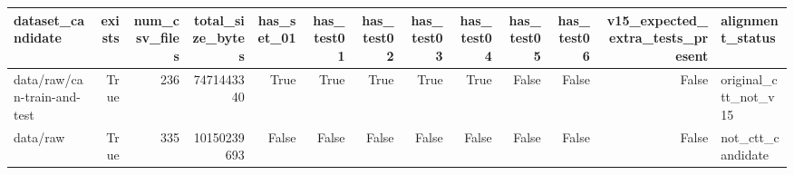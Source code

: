 \begin{tabular}{lrrrrrrrrrrrl}
\toprule
dataset\_candidate & exists & num\_csv\_files & total\_size\_bytes & has\_set\_01 & has\_test01 & has\_test02 & has\_test03 & has\_test04 & has\_test05 & has\_test06 & v15\_expected\_extra\_tests\_present & alignment\_status \\
\midrule
data/raw/can-train-and-test & True & 236 & 7471443340 & True & True & True & True & True & False & False & False & original\_ctt\_not\_v15 \\
data/raw & True & 335 & 10150239693 & False & False & False & False & False & False & False & False & not\_ctt\_candidate \\
\bottomrule
\end{tabular}
